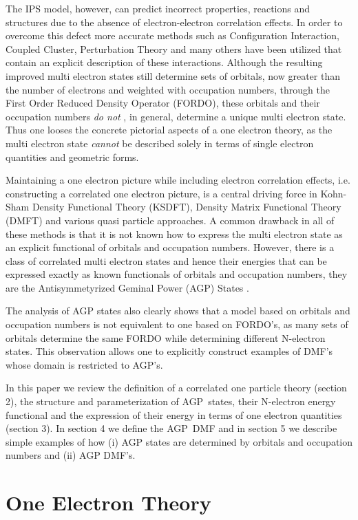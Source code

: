 \documentclass[aps,preprint]{revtex4}%
\begin{document}
The IPS model, however, can predict incorrect properties, reactions and
structures due to the absence of electron-electron correlation effects. In
order to overcome this defect more accurate methods such as Configuration
Interaction, Coupled Cluster, Perturbation Theory and many others have been
utilized that contain an explicit description of these interactions. Although
the resulting improved multi electron states still determine sets of orbitals,
now greater than the number of electrons and weighted with occupation numbers,
through the First Order Reduced Density Operator (FORDO), these orbitals and
their occupation numbers \emph{do not }, in general, determine a unique multi
electron state. Thus one looses the concrete pictorial aspects of a one
electron theory, as the multi electron state \emph{cannot} be described solely
in terms of single electron quantities and geometric forms.

Maintaining a one electron picture while including electron correlation
effects, i.e. constructing a correlated one electron picture, is a central
driving force in Kohn-Sham Density Functional Theory (KSDFT), Density Matrix
Functional Theory (DMFT) and various quasi particle approaches. A common
drawback in all of these methods is that it is not known how to express the
multi electron state as an explicit functional of orbitals and occupation
numbers. However, there is a class of correlated multi electron states and
hence their energies that can be expressed exactly as known functionals of
orbitals and occupation numbers, they are the Antisymmetyrized Geminal Power
(AGP) States \cite{OrtizWeiner2006}.

The analysis of AGP states also clearly shows that a model based on orbitals
and occupation numbers is not equivalent to one based on FORDO's, as many sets
of orbitals determine the same FORDO while determining different N-electron
states. This observation allows one to explicitly construct examples of DMF's
whose domain is restricted to AGP's.

In this paper we review the definition of a correlated one particle theory
(section 2), the structure and parameterization of AGP\ states, their
N-electron energy functional and the expression of their energy in terms of
one electron quantities (section 3). In section 4 we define the AGP\ DMF and
in section 5 we describe simple examples of how (i) AGP states are determined
by orbitals and occupation numbers and (ii) AGP DMF's.

\section{One Electron Theory\label{OET}}
\end{document}
